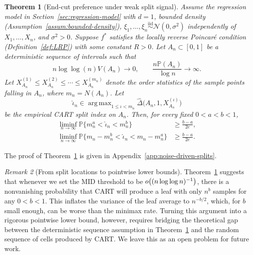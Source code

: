 \documentclass[11pt]{article}
\theoremstyle{plain}
\newtheorem{theorem}{Theorem}[section]
\theoremstyle{definition}
\theoremstyle{remark}
\newtheorem{remark}[theorem]{Remark}
\theoremstyle{plain}
\DeclareMathOperator*{\argmax}{arg\,max}
\DeclarePairedDelimiter{\paren}{(}{)}
\renewcommand{\P}{\mathbb{P}}
\newcommand{\1}{\mathbbm{1}}
\begin{document}
\begin{theorem}[End-cut preference under weak split signal]
\label{thm:noise-driven-split}
Assume the regression model in Section~\ref{sec:regression-model} with $d=1$,
bounded density (Assumption~\ref{assum:bounded-density}),
$\xi_1,\ldots,\xi_n\stackrel{\mathrm{iid}}{\sim}\mathcal N(0,\sigma^2)$ independently of $X_1,\ldots,X_n$, and
$\sigma^2>0$. Suppose $f^*$ satisfies the locally reverse Poincar\'e condition (Definition~\ref{def:LRP})
with some constant $R>0$.
Let $A_n\subset[0,1]$ be a deterministic sequence of intervals such that
\begin{equation}\label{eq:weak-signal-variation}
    n\log\log (n)V(A_n)\to 0,
    \qquad
    \frac{n\P(A_n)}{\log n}\to \infty .
\end{equation}
Let
$X_{A_n}^{(1)}\le X_{A_n}^{(2)}\le\cdots\le X_{A_n}^{(m_n)}$
denote the order statistics of the sample points falling in $A_n$, where
$m_n=N(A_n)$. Let
\[
    \hat\iota_n\in
    \argmax_{1\le \iota<m_n}
    \widehat\Delta\bigl(A_n,1,X_{A_n}^{(\iota)}\bigr)
\]
be the empirical CART split index on $A_n$. Then, for every fixed
$0<a<b<1$,
\begin{equation}\label{eq:unreliable}
\begin{aligned}
  \liminf_{n\to\infty}\P\bigl\{m_n^a<\hat\iota_n<m_n^b\bigr\}
  &\ge
  \frac{b-a}{2e},\\
  \liminf_{n\to\infty}\P\bigl\{m_n-m_n^b<\hat\iota_n<m_n-m_n^a\bigr\}
  &\ge
  \frac{b-a}{2e}.
\end{aligned}
\end{equation}
\end{theorem}


The proof of Theorem~\ref{thm:noise-driven-split} is given in
Appendix~\ref{app:noise-driven-splits}.

\begin{remark}[From split locations to pointwise lower bounds] \label{rem:pointwise-lower-bound}
    Theorem~\ref{thm:noise-driven-split} suggests that whenever we set the MID threshold to be $o\paren*{(n\log\log n)^{-1}}$, there is a nonvanishing probability that CART will produce a leaf with only $n^b$ samples for any $0 < b<1$.
    This inflates the variance of the leaf average to $n^{-b/2}$, which, for $b$ small enough, can be worse than the minimax rate.
    Turning this argument into a rigorous pointwise lower bound, however, requires bridging the theoretical gap between the deterministic sequence assumption in Theorem~\ref{thm:noise-driven-split} and the random sequence of cells produced by CART.
    We leave this as an open problem for future work.
\end{remark}
\end{document}
